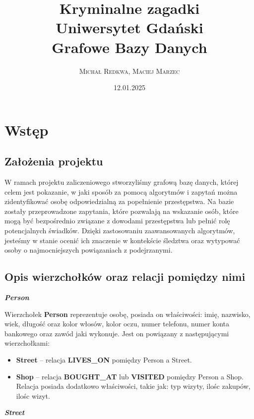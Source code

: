 \documentclass[a4paper,12pt]{article}
\title{\vspace{2cm} \textbf{\Huge Kryminalne zagadki} \\[1cm] \large Uniwersytet Gdański \\ Grafowe Bazy Danych \vspace{2cm}}
\author{\textsc{Michał Redkwa, Maciej Marzec}}
\date{12.01.2025}
\begin{document}
\maketitle

\newpage

\section{Wstęp}
\subsection{Założenia projektu}

W ramach projektu zaliczeniowego stworzyliśmy grafową bazę danych, której celem jest pokazanie, w jaki sposób za pomocą algorytmów i zapytań można zidentyfikować osobę odpowiedzialną za popełnienie przestępstwa. Na bazie zostały przeprowadzone zapytania, które pozwalają na wskazanie osób, które mogą być bezpośrednio związane z dowodami przestępstwa lub pełnić rolę potencjalnych świadków. Dzięki zastosowaniu zaawansowanych algorytmów, jesteśmy w stanie ocenić ich znaczenie w kontekście śledztwa oraz wytypować osoby o najmocniejszych powiązaniach z podejrzanymi.

\subsection{Opis wierzchołków oraz relacji pomiędzy nimi}

\begin{center}
    \textbf{\textit{Person}}
\end{center}

Wierzchołek \textbf{Person} reprezentuje osobę, posiada on właściwości: imię, nazwisko, wiek, długość oraz kolor włosów, kolor oczu, numer telefonu, numer konta bankowego oraz zawód jaki wykonuje. Jest on powiązany z następującymi wierzchołkami:

\begin{itemize}
    \item \textbf{Street} – relacja \textbf{LIVES\_ON} pomiędzy Person a Street.
    \item \textbf{Shop} – relacja \textbf{BOUGHT\_AT} lub \textbf{VISITED} pomiędzy Person a Shop. Relacja posiada dodatkowo właściwości, takie jak: typ wizyty, ilośc zakupów, ilośc wizyt.
\end{itemize}

\begin{center}
    \textbf{\textit{Street}}
\end{center}
\end{document}
